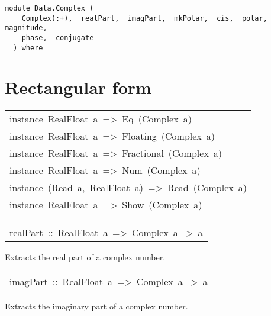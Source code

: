 \label{module:Data.Complex}
\haddockbeginheader
{\haddockverb\begin{verbatim}
module Data.Complex (
    Complex(:+),  realPart,  imagPart,  mkPolar,  cis,  polar,  magnitude, 
    phase,  conjugate
  ) where\end{verbatim}}
\haddockendheader

\section{Rectangular form
}
\begin{haddockdesc}
\item[\begin{tabular}{@{}l}
instance\ RealFloat\ a\ =>\ Eq\ (Complex\ a)\\instance\ RealFloat\ a\ =>\ Floating\ (Complex\ a)\\instance\ RealFloat\ a\ =>\ Fractional\ (Complex\ a)\\instance\ RealFloat\ a\ =>\ Num\ (Complex\ a)\\instance\ (Read\ a,\ RealFloat\ a)\ =>\ Read\ (Complex\ a)\\instance\ RealFloat\ a\ =>\ Show\ (Complex\ a)
\end{tabular}]
\end{haddockdesc}
\begin{haddockdesc}
\item[\begin{tabular}{@{}l}
realPart\ ::\ RealFloat\ a\ =>\ Complex\ a\ ->\ a
\end{tabular}]\haddockbegindoc
Extracts the real part of a complex number.
\par

\end{haddockdesc}
\begin{haddockdesc}
\item[\begin{tabular}{@{}l}
imagPart\ ::\ RealFloat\ a\ =>\ Complex\ a\ ->\ a
\end{tabular}]\haddockbegindoc
Extracts the imaginary part of a complex number.
\par

\end{haddockdesc}
